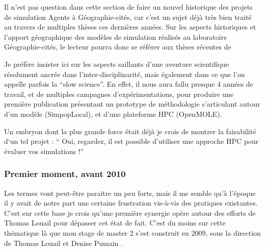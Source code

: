 
Il n'est pas question dans cette section de faire un nouvel historique des projets de simulation Agents à Géographie-cités, car c'est un sujet déjà très bien traité au travers de multiples thèses ces dernières années. Sur les aspects historiques et l'apport géographique des modèles de simulation réalisés au laboratoire Géographie-cités, le lecteur pourra donc se référer aux thèses récentes de \autocites{Glisse2007, Louail2010, Schmitt2014, Cottineau2014b}

Je préfère insister ici sur les aspects saillants d'une aventure scientifique résolument ancrée dans l'inter-disciplinarité, mais également dans ce que l'on appelle parfois la \foreignquote{english}{slow science}. En effet, il nous aura  fallu presque 4 années de travail, et de multiples campagnes d'expérimentations, pour produire une première publication \autocite{Schmitt2015} présentant un prototype de méthodologie s'articulant autour d'un modèle (SimpopLocal), et d'une plateforme HPC (OpenMOLE).

Un embryon dont la plus grande force était déjà je crois de montrer la faisabilité d`un tel projet : \enquote{ Oui, regardez, il est possible d'utiliser une approche HPC pour évaluer vos simulations !}


\subsubsection{Premier moment, avant 2010}
\label{sssec:premier_moment}

Les termes vont peut-être paraitre un peu forts, mais il me semble qu'à l'époque il y avait de notre part une certaine frustration vis-à-vis des pratiques existantes. C'est sur cette base je crois qu'une première synergie opère autour des efforts de Thomas Louail pour dépasser cet état de fait. C'est du moins sur cette thématique là que mon stage de master 2 s'est construit en 2009, sous la direction de Thomas Louail et Denise Pumain \autocite{Rey2009}.


